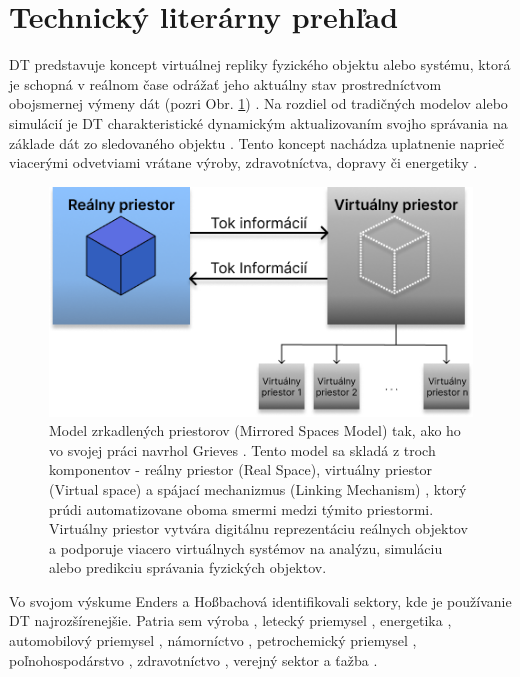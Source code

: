 \section{Technický literárny prehľad}
DT predstavuje koncept virtuálnej repliky fyzického objektu alebo systému, ktorá je schopná v reálnom čase odrážať jeho aktuálny stav prostredníctvom obojsmernej výmeny dát (pozri Obr. \ref{fig:PLM}) \cite{DT:OriginToFuture}. Na rozdiel od tradičných modelov alebo simulácií je DT charakteristické dynamickým aktualizovaním svojho správania na základe dát zo sledovaného objektu \cite{systematicReview}. Tento koncept nachádza uplatnenie naprieč viacerými odvetviami vrátane výroby, zdravotníctva, dopravy či energetiky \cite{5gandbeyond}.\\

\begin{figure}[H]
    \centering
    \includegraphics[width=0.8\linewidth]{assets/images/Grieves_PLM_model.png}
    \caption[Model zrkadlených priestorov]{Model zrkadlených priestorov (Mirrored Spaces Model) tak, ako ho vo svojej práci navrhol Grieves \cite{Grieves}. Tento model sa skladá z troch komponentov - reálny priestor (Real Space), virtuálny priestor (Virtual space) a spájací mechanizmus (Linking Mechanism) \cite{DT:OriginToFuture}, ktorý prúdi automatizovane oboma smermi medzi týmito priestormi. Virtuálny priestor vytvára digitálnu reprezentáciu reálnych objektov a podporuje viacero virtuálnych systémov na analýzu, simuláciu alebo predikciu správania fyzických objektov.}
    \label{fig:PLM}
\end{figure}

Vo  svojom výskume Enders a Hoßbachová \cite{DimensionOfDTAplication} identifikovali sektory, kde je používanie DT najrozšírenejšie. Patria sem výroba \cite{manuf}, letecký priemysel \cite{aircraft}, energetika \cite{energy}, automobilový priemysel \cite{automotive}, námorníctvo \cite{marine}, petrochemický priemysel \cite{oil}, poľnohospodárstvo \cite{agriculture}, zdravotníctvo \cite{health}, verejný sektor \cite{education} a ťažba \cite{mining}.


